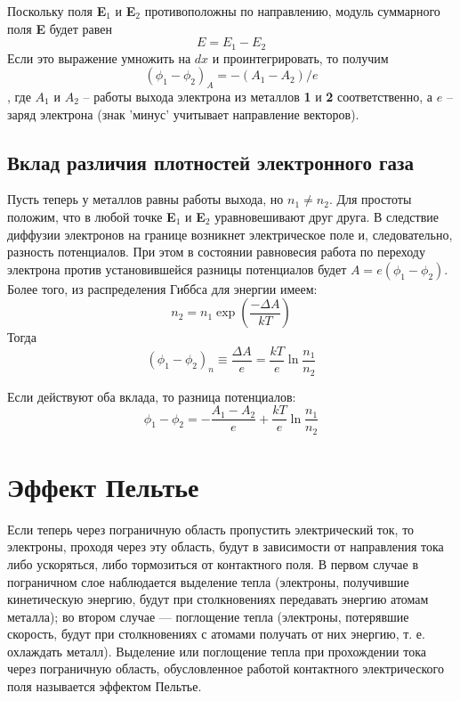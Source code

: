 \documentclass[a4paper, 12pt, openany]{book}
\begin{document}
	Поскольку поля \textbf{E$_1$} и \textbf{E$_2$} противоположны по направлению, модуль суммарного поля \textbf{E} будет равен
	$$E = E_1 - E_2$$ Если это выражение умножить на $dx$ и проинтегрировать, то получим \begin{equation}
	(\phi_1 - \phi_2)_A = -(A_1 - A_2)/e
	\label{eq1}
	\end{equation}, где $A_1$ и $A_2$ -- работы выхода электрона из металлов \textbf{1} и \textbf{2} соответственно, а $e$ -- заряд электрона (знак 'минус' учитывает направление векторов).
	
	\subsection{Вклад различия плотностей электронного газа}
	Пусть теперь у металлов равны работы выхода, но $n_1 \ne n_2$. Для простоты положим, что в любой точке \textbf{E$_1$} и \textbf{E$_2$} уравновешивают друг друга. В следствие диффузии электронов на границе возникнет электрическое поле и, следовательно, разность потенциалов. При этом в состоянии равновесия работа по переходу электрона против установившейся разницы потенциалов будет $A = e(\phi_1 - \phi_2)$. Более того, из распределения Гиббса для энергии имеем:
	$$ n_2 = n_1 \exp\left(\frac{-\Delta A}{kT}\right)$$
	Тогда
	\begin{equation}
	(\phi_1 - \phi_2)_n \equiv \frac{\Delta A}{e} = \frac{kT}{e} \ln\frac{n_1}{n_2}
	\label{eq2}
	\end{equation}
	
	Если действуют оба вклада, то разница потенциалов:
	\begin{equation}
	\phi_1 - \phi_2 = - \frac{A_1 - A_2}{e} + \frac{kT}{e} \ln\frac{n_1}{n_2}
	\label{finEq}
	\end{equation}
	
	\section{Эффект Пельтье}
	Если теперь через пограничную область пропустить электрический ток, то электроны, проходя через эту область, будут в зависимости от направления тока либо ускоряться, либо тормозиться от контактного поля. В первом случае в пограничном слое наблюдается выделение тепла (электроны, получившие кинетическую энергию, будут при столкновениях передавать энергию атомам металла); во втором случае — поглощение тепла (электроны, потерявшие скорость, будут
	при столкновениях с атомами получать от них энергию, т. е. охлаждать металл). Выделение или поглощение тепла при прохождении тока через пограничную область, обусловленное работой контактного электрического поля называется эффектом Пельтье.
	
\end{document}
